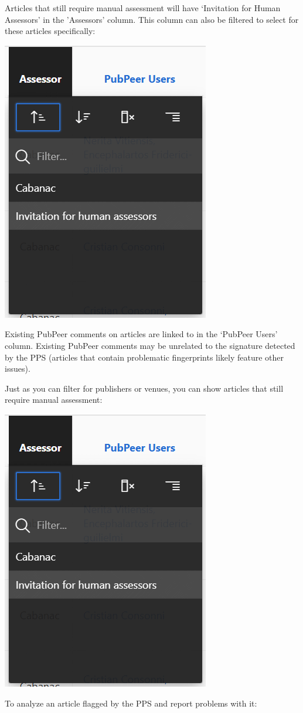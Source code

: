 \documentclass[letterpaper, 12pt]{article}
\begin{document}
Articles that still require manual assessment will have `Invitation for Human Assessors’ in the 'Assessors' column. This column can also be filtered to select for these articles specifically:

\includegraphics[width=0.3\linewidth]{img/getting_started/FilteringAssessors.png}

Existing PubPeer comments on articles are linked to in the `PubPeer Users' column. Existing PubPeer comments may be unrelated to the signature detected by the PPS (articles that contain problematic fingerprints likely feature other issues).

Just as you can filter for publishers or venues, you can show articles that still require manual assessment:

\includegraphics[width=0.3\linewidth]{img/getting_started/FilteringAssessors.png}



To analyze an article flagged by the PPS and report problems with it:
\end{document}
